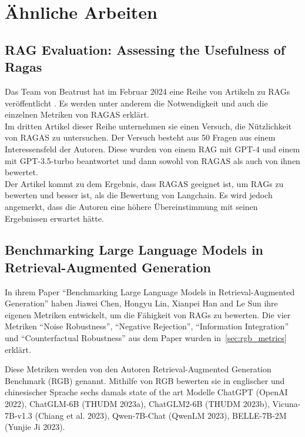 \chapter{Ähnliche Arbeiten}

\section{RAG Evaluation: Assessing the Usefulness of Ragas}
Das Team von Beatrust hat im Februar 2024 eine Reihe von Artikeln zu RAGs veröffentlicht \cite{beatrust_ragas_2024}. Es werden unter anderem die Notwendigkeit und auch die einzelnen Metriken von RAGAS erklärt.\\
Im dritten Artikel dieser Reihe unternehmen sie einen Versuch, die Nützlichkeit von RAGAS zu untersuchen.
Der Versuch besteht aus 50 Fragen aus einem Interessensfeld der Autoren. Diese wurden von einem RAG mit GPT-4 und einem mit GPT-3.5-turbo beantwortet und dann sowohl von RAGAS als auch von ihnen bewertet.\\
Der Artikel kommt zu dem Ergebnis, dass RAGAS geeignet ist, um RAGs zu bewerten und besser ist, als die Bewertung von Langchain. Es wird jedoch angemerkt, dass die Autoren eine höhere Übereinstimmung mit seinen Ergebnissen erwartet hätte.



\section{Benchmarking Large Language Models in Retrieval-Augmented Generation}
\label{sec:rgb}
In ihrem Paper \enquote{Benchmarking Large Language Models in Retrieval-Augmented Generation}\cite{2023arXiv230901431C} haben Jiawei Chen, Hongyu Lin, Xianpei Han and Le Sun ihre eigenen Metriken entwickelt, um die Fähigkeit von RAGs zu bewerten.
Die vier Metriken \enquote{Noise Robustness}, \enquote{Negative Rejection}, \enquote{Information Integration} und \enquote{Counterfactual Robustness} aus dem Paper wurden in~\ref{sec:rgb_metrics} erklärt.

Diese Metriken werden von den Autoren Retrieval-Augmented Generation Benchmark (RGB) genannt.
Mithilfe von RGB bewerten sie in englischer und chinesischer Sprache sechs damals state of the art Modelle ChatGPT (OpenAI 2022), ChatGLM-6B (THUDM 2023a), ChatGLM2-6B (THUDM 2023b), Vicuna-7B-v1.3 (Chiang et al. 2023), Qwen-7B-Chat (QwenLM 2023), BELLE-7B-2M (Yunjie Ji 2023).

